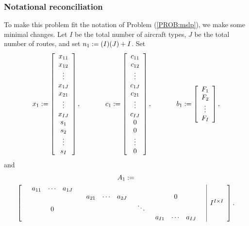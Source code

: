 \subsubsection{Notational reconciliation}
To make this problem fit the notation of Problem (\ref{PROB:mslp}), we make some minimal changes.  Let $I$ be the total number of aircraft types, $J$ be the total number of routes, and set $n_1 := (I)(J) + I$.  Set
\begin{equation*}
x_1:= \left[\begin{array}{c}
		x_{11}\\
		x_{12}\\
		\vdots\\
		x_{1J}\\
		x_{21}\\
		\vdots\\
		x_{IJ}\\
		s_1\\
		s_2\\
		\vdots\\
		s_{I}
		\end{array} \right],
\hspace{0.5in}
c_1:= \left[\begin{array}{c}
		c_{11}\\
		c_{12}\\
		\vdots\\
		c_{1J}\\
		c_{21}\\
		\vdots\\
		c_{IJ}\\
		0\\
		0\\
		\vdots\\
		0
		\end{array} \right],
\hspace{0.5in}
b_1:= \left[ \begin{array}{c}
		F_1\\
		F_2\\
		\vdots\\
		F_I
		\end{array} \right],
\end{equation*}
and
\begin{multline*}
A_1:=\\
\left[
\begin{array}{c|c} 
	\begin{array}{cccc}
		\begin{array}{ccc}
			a_{11} & \cdots & a_{1J} 
		\end{array} &  &  \\
		&	  
		\begin{array}{ccc}
			a_{21}& \cdots & a_{2J}
		\end{array} & &0\\
		0 &		&\ddots&		\\
		&&&
		\begin{array}{ccc}
			a_{I1} & \cdots & a_{IJ} 
		\end{array}
	\end{array} 
& I^{I \times I}
\end{array}
\right].
\end{multline*}

